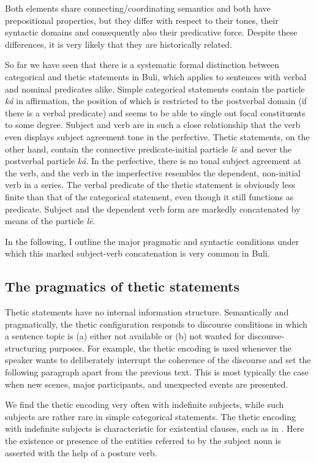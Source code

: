\documentclass[output=paper]{langsci/langscibook}
\begin{document}
Both elements share connecting/coordinating semantics and both have prepositional properties, but they differ with respect to their tones, their syntactic domains and consequently also their predicative force. Despite these differences, it is very likely that they are historically related.

So far we have seen that there is a systematic formal distinction between categorical and thetic statements in Buli, which applies to sentences with verbal and nominal predicates alike. Simple categorical statements contain the particle \textit{ká} in affirmation, the position of which is restricted to the postverbal domain (if there is a verbal predicate) and seems to be able to single out focal constituents to some degree. Subject and verb are in such a close relationship that the verb even displays subject agreement tone in the perfective. Thetic statements, on the other hand, contain the connective predicate-initial particle \textit{l\={e}} and never the postverbal particle \textit{ká}. In the perfective, there is no tonal subject agreement at the verb, and the verb in the imperfective resembles the dependent, non-initial verb in a series. The verbal predicate of the thetic statement is obviously less finite than that of the categorical statement, even though it still functions as predicate. Subject and the dependent verb form are markedly concatenated by means of the particle \textit{l\={e}}.

In the following, I outline the major pragmatic and syntactic conditions under which this marked subject-verb concatenation is very common in Buli.

\subsection{The pragmatics of thetic statements}\label{sec:schwarz:3.4}

Thetic statements have no internal information structure. Semantically and pragmatically, the thetic configuration responds to discourse conditions in which a sentence topic is (a) either not available or (b) not wanted for discourse-structuring purposes. For example, the thetic encoding is used whenever the speaker wants to deliberately interrupt the coherence of the discourse and set the following paragraph apart from the previous text. This is most typically the case when new scenes, major participants, and unexpected events are presented. 

We find the thetic encoding very often with indefinite subjects, while such subjects are rather rare in simple categorical statements. The thetic encoding with indefinite subjects is characteristic for existential clauses, such as in . Here the existence or presence of the entities referred to by the subject noun is asserted with the help of a posture verb.
\end{document}
